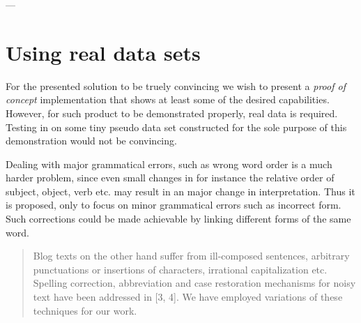 ---



\clearpage

\section{Using real data sets}


For the presented solution to be truely convincing we wish to present a \emph{proof of concept} implementation that shows at least some of the desired capabilities. However, for such product to be demonstrated properly, real data is required. Testing in on some tiny pseudo data set constructed for the sole purpose of this demonstration would not be convincing.



Dealing with major grammatical errors, such as wrong word order is a much harder problem, since even small changes in for instance the relative order of subject, object, verb etc. may result in an major change in interpretation. Thus it is proposed, only to focus on minor grammatical errors such as incorrect form. Such corrections could be made achievable by linking different forms of the same word.

\begin{quote}
	Blog texts on the other hand suffer from ill-composed sentences, 
arbitrary punctuations or insertions of characters, irrational 
capitalization etc. Spelling correction, abbreviation and case 
restoration mechanisms for noisy text have been addressed in [3, 
4]. We have employed variations of these techniques for our 
work.
\end{quote}

